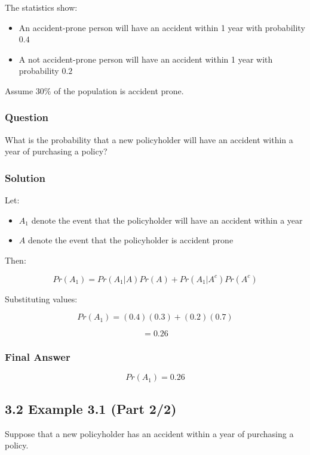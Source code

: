 \documentclass[12pt]{article}
\begin{document}
The statistics show:

\begin{itemize}
    \item An accident-prone person will have an accident within 1 year with probability $0.4$
    \item A not accident-prone person will have an accident within 1 year with probability $0.2$
\end{itemize}

Assume $30\%$ of the population is accident prone.

\subsubsection*{\textbf{Question}}

What is the probability that a new policyholder will have an accident within a year of purchasing a policy?

\subsubsection*{\textbf{Solution}}

Let:

\begin{itemize}
    \item $A_1$ denote the event that the policyholder will have an accident within a year
    \item $A$ denote the event that the policyholder is accident prone
\end{itemize}

Then:

\[
Pr(A_1) = Pr(A_1|A)Pr(A) + Pr(A_1|A^c)Pr(A^c)
\]

Substituting values:

\[
Pr(A_1) = (0.4)(0.3) + (0.2)(0.7)
\]

\[
= 0.26
\]

\subsubsection*{\textbf{Final Answer}}

\[
Pr(A_1) = 0.26
\]

\subsection*{\textbf{3.2 Example 3.1 (Part 2/2)}}

Suppose that a new policyholder has an accident within a year of purchasing a policy.
\end{document}

